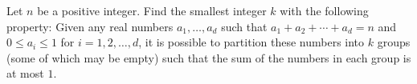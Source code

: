 Let $n$ be a positive integer. Find the smallest integer $k$ with the following property: Given any real numbers $a_1, \ldots, a_d$ such that $a_1 + a_2 + \cdots + a_d = n$ and $0 \leq a_i \leq 1$ for $i = 1, 2, \ldots, d$, it is possible to partition these numbers into $k$ groups (some of which may be empty) such that the sum of the numbers in each group is at most $1$.
